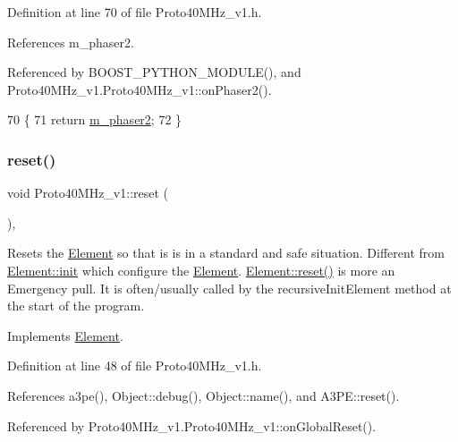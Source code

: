 Definition at line 70 of file Proto40\+M\+Hz\+\_\+v1.\+h.



References m\+\_\+phaser2.



Referenced by B\+O\+O\+S\+T\+\_\+\+P\+Y\+T\+H\+O\+N\+\_\+\+M\+O\+D\+U\+L\+E(), and Proto40\+M\+Hz\+\_\+v1.\+Proto40\+M\+Hz\+\_\+v1\+::on\+Phaser2().


\begin{DoxyCode}
70                    \{
71     \textcolor{keywordflow}{return} \hyperlink{classProto40MHz__v1_a201c755bc33cf5b6c14c6833e913755b}{m\_phaser2};
72   \} 
\end{DoxyCode}
\mbox{\label{classProto40MHz__v1_a321b46479def2e28e5727117cb5e05a1}} 
\subsubsection{\texorpdfstring{reset()}{reset()}}
{\footnotesize\ttfamily void Proto40\+M\+Hz\+\_\+v1\+::reset (\begin{DoxyParamCaption}{ }\end{DoxyParamCaption})\hspace{0.3cm}{\ttfamily [inline]}, {\ttfamily [virtual]}}

Resets the \hyperlink{classElement}{Element} so that is is in a standard and safe situation. Different from \hyperlink{classElement_af42754b5cabc198869222725218d695c}{Element\+::init} which configure the \hyperlink{classElement}{Element}. \hyperlink{classElement_a69efffa22f06909d768149715565cb56}{Element\+::reset()} is more an Emergency pull. It is often/usually called by the recursive\+Init\+Element method at the start of the program. 

Implements \hyperlink{classElement_a69efffa22f06909d768149715565cb56}{Element}.



Definition at line 48 of file Proto40\+M\+Hz\+\_\+v1.\+h.



References a3pe(), Object\+::debug(), Object\+::name(), and A3\+P\+E\+::reset().



Referenced by Proto40\+M\+Hz\+\_\+v1.\+Proto40\+M\+Hz\+\_\+v1\+::on\+Global\+Reset().


